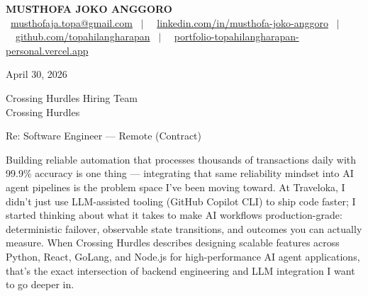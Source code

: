 \documentclass[11pt,a4paper]{article}
\newcommand{\contactline}[1]{\small #1}
\begin{document}
\begin{center}
    {\LARGE \textbf{MUSTHOFA JOKO ANGGORO}} \\[4pt]
    \contactline{
        \faEnvelope\ \href{mailto:musthofaja.topa@gmail.com}{musthofaja.topa@gmail.com} \ $|$ \ 
        \faLinkedin\ \href{https://www.linkedin.com/in/musthofa-joko-anggoro/}{linkedin.com/in/musthofa-joko-anggoro} \ $|$ \
        \faGithub\ \href{https://github.com/topahilangharapan}{github.com/topahilangharapan} \ $|$ \
        \faGlobe\ \href{https://portfolio-topahilangharapan-personal.vercel.app/}{portfolio-topahilangharapan-personal.vercel.app}
    }
\end{center}

\vspace{12pt}

April 30, 2026

\vspace{8pt}

Crossing Hurdles Hiring Team \\
Crossing Hurdles

\vspace{12pt}

Re: Software Engineer — Remote (Contract)

\vspace{12pt}


Building reliable automation that processes thousands of transactions daily with 99.9\% accuracy is one thing — integrating that same reliability mindset into AI agent pipelines is the problem space I've been moving toward. At Traveloka, I didn't just use LLM-assisted tooling (GitHub Copilot CLI) to ship code faster; I started thinking about what it takes to make AI workflows production-grade: deterministic failover, observable state transitions, and outcomes you can actually measure. When Crossing Hurdles describes designing scalable features across Python, React, GoLang, and Node.js for high-performance AI agent applications, that's the exact intersection of backend engineering and LLM integration I want to go deeper in.

\vspace{6pt}
\end{document}
